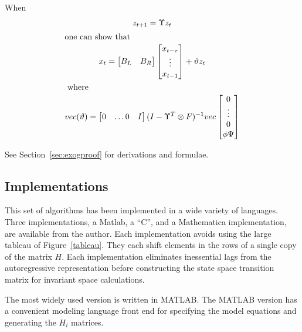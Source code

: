 \documentclass{elsart}
\begin{document}
\begin{thrm}\label{var}
  

When 
\begin{gather}
  z_{t+1} = \Upsilon{} z_t\\ \intertext{one can show that}
 x_{t} = \begin{bmatrix}
B_L& B_R  
\end{bmatrix}
 \begin{bmatrix}
     x_{t-\tau}\\\vdots\\ x_{t-1}
  \end{bmatrix} + \vartheta{} z_t
\\
\intertext{ where }
vec(\vartheta{}) =   \begin{bmatrix}
  0&\dots 0&I
  \end{bmatrix}
 (I - \Upsilon^T\otimes{} F)^{-1} vec
\begin{bmatrix}
0\\ \vdots \\ 0 \\
\phi\Psi%
\end{bmatrix}
\end{gather}
\end{thrm}

See Section~\ref{sec:exogproof} for  derivations and formulae.


\subsection{Implementations}
\label{sec:imple}

This set of algorithms has been implemented in a wide variety of languages.
Three implementations, a  Matlab, a ``C'', and a Mathematica implementation,
 are available from the author.%
Each implementation avoids using the large tableau of Figure~\ref{tableau}.
They each  shift elements in the
rows of a single copy of the matrix $H$. 
Each implementation
eliminates inessential lags from the autoregressive representation before
constructing the state space transition matrix for invariant space 
calculations.  



The most widely used version is written in MATLAB. The MATLAB version
has a convenient modeling language front end for specifying the model
equations and generating the $H_i$ matrices. 
\end{document}
